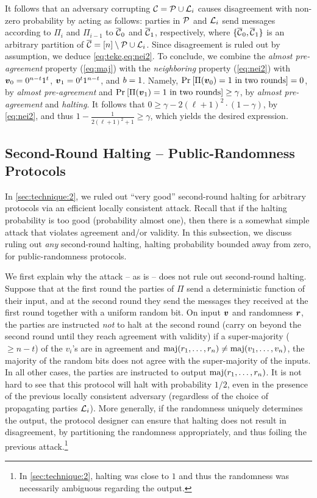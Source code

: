 It follows that an adversary corrupting $\mathcal{C}=\mathcal{P} \cup {\cal{L}}_i$ causes disagreement with non-zero probability by acting as follows: parties in $\mathcal{P}$ and ${\cal{L}}_i$ send messages according to $\Pi_i$ and $\Pi_{i-1}$ to $\overline{\mathcal{C}}_0$ and $\overline{\mathcal{C}}_1$, respectively, where $\{\overline{\mathcal{C}}_0,\overline{\mathcal{C}}_1\}$ is an arbitrary partition of $\overline{\mathcal{C}}= [n]\setminus \mathcal{P}\cup {\cal{L}}_i$. Since disagreement is ruled out by assumption, we deduce \cref{eq:teke,eq:nei2}. To conclude, we combine the \emph{almost pre-agreement} property (\cref{eq:maj}) with the \emph{neighboring} property (\cref{eq:nei2}) with
${ \boldsymbol{v}}_0=0^{n-t}1^{t}$, ${ \boldsymbol{v}}_1=0^{t}1^{n-t}$, and $b=1$.
Namely, $\Pr_{}\left[\Pi({ \boldsymbol{v}}_0)=1\text{ in two rounds}\right]=0$, by \emph{almost pre-agreement} and $\Pr_{}\left[\Pi({ \boldsymbol{v}}_1)=1\text{ in two rounds}\right]\ge\gamma$, by \emph{almost pre-agreement} and \emph{halting}. It follows that $0 \ge \gamma - 2 (\ell +1)^2 \cdot (1-\gamma)$, by \cref{eq:nei2}, and thus $1-\frac{1}{2(\ell+1)^2+1} \ge \gamma$, which yields the desired expression.


\subsection{Second-Round Halting -- Public-Randomness Protocols}\label{sec:technique:3}

In \cref{sec:technique:2}, we ruled out ``very good'' second-round halting for arbitrary protocols via an efficient locally consistent attack. Recall that if the halting probability is too good (probability almost one), then there is a somewhat simple attack that violates agreement and/or validity. In this subsection, we discuss ruling out \emph{any} second-round halting, \ie halting probability bounded away from zero, for public-randomness protocols.

We first explain why the attack -- as is -- does not rule out second-round halting. Suppose that at the first round the parties of $\Pi$ send a deterministic function of their input, and at the second round they send the messages they received at the first round together with a uniform random bit. On input ${ \boldsymbol{v}}$ and randomness ${ \boldsymbol{r}}$, the parties are instructed \emph{not} to halt at the second round (\ie carry on beyond the second round until they reach agreement with validity) if a super-majority ($\ge n-t$) of the $v_i$'s are in agreement and $\operatorname*{maj}(r_1,\ldots, r_n)\neq \operatorname*{maj}(v_1,\ldots, v_n)$, \ie the majority of the random bits does not agree with the super-majority of the inputs. In all other cases, the parties are instructed to output $\operatorname*{maj}(r_1,\ldots, r_n)$.
It is not hard to see that this protocol will halt with probability $1/2$, even in the presence of the previous locally consistent adversary (regardless of the choice of propagating parties ${\cal{L}}_i$). More generally, if the randomness uniquely determines the output, the protocol designer can ensure that halting does not result in disagreement, by partitioning the randomness appropriately, and thus foiling the previous attack.\footnote{In \cref{sec:technique:2}, halting was close to $1$ and thus the randomness was necessarily ambiguous regarding the output.}

